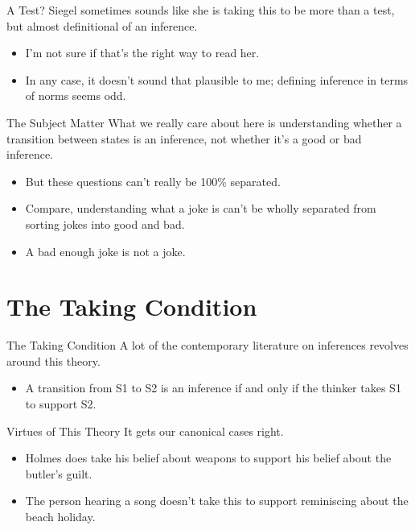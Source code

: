 \documentclass[
  17pt,
  letterpaper,
  ignorenonframetext,
  aspectratio=169,
  handout,
  xcolor={dvipsnames}]{beamer}
\providecommand{\tightlist}{%
  \setlength{\itemsep}{0pt}\setlength{\parskip}{0pt}}\usepackage{longtable,booktabs,array}
\begin{document}
\begin{frame}{A Test?}
\protect\hypertarget{a-test-2}{}
Siegel sometimes sounds like she is taking this to be more than a test,
but almost definitional of an inference.

\begin{itemize}[<+->]
\tightlist
\item
  I'm not sure if that's the right way to read her.
\item
  In any case, it doesn't sound that plausible to me; defining inference
  in terms of norms seems odd.
\end{itemize}
\end{frame}

\begin{frame}{The Subject Matter}
\protect\hypertarget{the-subject-matter}{}
What we really care about here is understanding whether a transition
between states is an inference, not whether it's a good or bad
inference.

\begin{itemize}[<+->]
\tightlist
\item
  But these questions can't really be 100\% separated.
\item
  Compare, understanding what a joke is can't be wholly separated from
  sorting jokes into good and bad.
\item
  A bad enough joke is not a joke.
\end{itemize}
\end{frame}

\hypertarget{the-taking-condition}{%
\section{The Taking Condition}\label{the-taking-condition}}

\begin{frame}{The Taking Condition}
\protect\hypertarget{the-taking-condition-1}{}
A lot of the contemporary literature on inferences revolves around this
theory.

\begin{itemize}[<+->]
\tightlist
\item
  A transition from S1 to S2 is an inference if and only if the thinker
  takes S1 to support S2.
\end{itemize}
\end{frame}

\begin{frame}{Virtues of This Theory}
\protect\hypertarget{virtues-of-this-theory}{}
It gets our canonical cases right.

\begin{itemize}[<+->]
\tightlist
\item
  Holmes does take his belief about weapons to support his belief about
  the butler's guilt.
\item
  The person hearing a song doesn't take this to support reminiscing
  about the beach holiday.
\end{itemize}
\end{frame}
\end{document}
